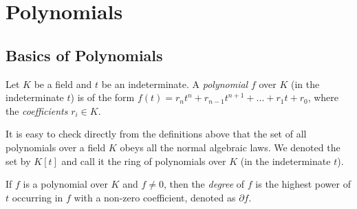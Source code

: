 
\section{Polynomials}
\subsection{Basics of Polynomials}

\begin{definition}
    Let $K$ be a field and $t$ be an indeterminate. A \textit{polynomial} $f$ over $K$ (in the indeterminate $t$) is of the form $f(t) = r_n t^n + r_{n-1} t^{n+1} + ... + r_1 t + r_0$, where the \textit{coefficients} $r_i \in K$. 
\end{definition}

It is easy to check directly from the definitions above that the set of all polynomials over a field $K$ obeys all the normal algebraic laws. We denoted the set by $K[t]$ and call it the ring of polynomials over $K$ (in the indeterminate $t$).

\begin{definition}
	If $f$ is a polynomial over $K$ and $f \neq 0$, then the \textit{degree} of $f$ is the highest power of $t$ occurring in $f$ with a non-zero coefficient, denoted as $\partial f$. 
\end{definition}




%
%    

